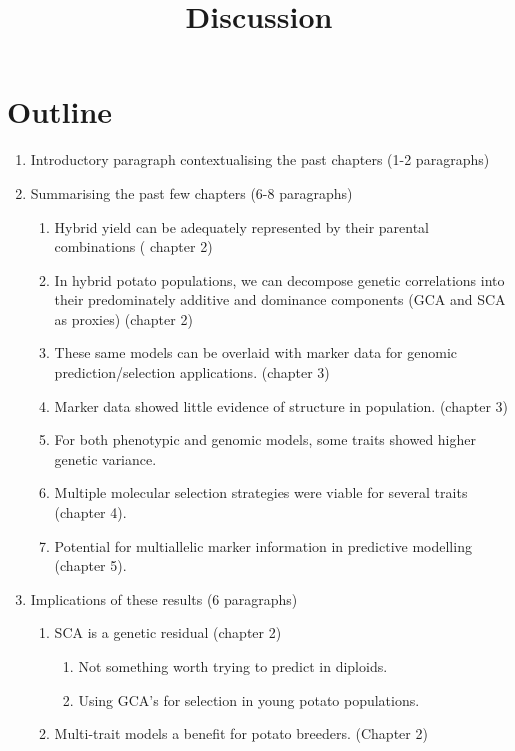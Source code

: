 \documentclass[
]{article}
\title{Discussion}
\author{}
\date{}
\providecommand{\tightlist}{%
  \setlength{\itemsep}{0pt}\setlength{\parskip}{0pt}}\usepackage{longtable,booktabs,array}
\begin{document}
\maketitle


\section{Outline}\label{outline}

\begin{enumerate}
\def\labelenumi{\arabic{enumi}.}
\item
  Introductory paragraph contextualising the past chapters (1-2
  paragraphs)
\item
  Summarising the past few chapters (6-8 paragraphs)

  \begin{enumerate}
  \def\labelenumii{\roman{enumii})}
  \tightlist
  \item
    Hybrid yield can be adequately represented by their parental
    combinations ( chapter 2)
  \item
    In hybrid potato populations, we can decompose genetic correlations
    into their predominately additive and dominance components (GCA and
    SCA as proxies) (chapter 2)
  \item
    These same models can be overlaid with marker data for genomic
    prediction/selection applications. (chapter 3)
  \item
    Marker data showed little evidence of structure in population.
    (chapter 3)
  \item
    For both phenotypic and genomic models, some traits showed higher
    genetic variance.
  \item
    Multiple molecular selection strategies were viable for several
    traits (chapter 4).
  \item
    Potential for multiallelic marker information in predictive
    modelling (chapter 5).
  \end{enumerate}
\item
  Implications of these results (6 paragraphs)

  \begin{enumerate}
  \def\labelenumii{\roman{enumii})}
  \tightlist
  \item
    SCA is a genetic residual \autocite{Bernardo2016} (chapter 2)

    \begin{enumerate}
    \def\labelenumiii{\Alph{enumiii}.}
    \tightlist
    \item
      Not something worth trying to predict in diploids.
    \item
      Using GCA's for selection in young potato populations.
    \end{enumerate}
  \item
    Multi-trait models a benefit for potato breeders. (Chapter 2)


\end{enumerate}
\end{enumerate}
\end{document}
